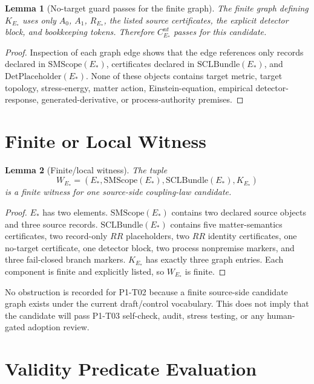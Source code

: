 \documentclass[11pt]{article}
\newcommand{\EStar}{E_{\ast}}
\newcommand{\SMScope}{\mathrm{SMScope}}
\newcommand{\SCLBundle}{\mathrm{SCLBundle}}
\newcommand{\DetPlaceholder}{\mathrm{DetPlaceholder}}
\newcommand{\KStar}{K_{E_{\ast}}}
\newtheorem{lemma}{Lemma}
\begin{document}
\begin{lemma}[No-target guard passes for the finite graph]
The finite graph defining \(\KStar\) uses only \(A_0\), \(A_1\),
\(R_{\EStar}\), the listed source certificates, the explicit detector block,
and bookkeeping tokens. Therefore \(C^{nt}_{\EStar}\) passes for this
candidate.
\end{lemma}

\begin{proof}
Inspection of each graph edge shows that the edge references only records
declared in \(\SMScope(\EStar)\), certificates declared in
\(\SCLBundle(\EStar)\), and \(\DetPlaceholder(\EStar)\). None of these
objects contains target metric, target topology, stress-energy, matter action,
Einstein-equation, empirical detector-response, generated-derivative, or
process-authority premises.
\end{proof}

\section{Finite or Local Witness}

\begin{lemma}[Finite/local witness]
The tuple
\[
  W_{\EStar}=(\EStar,\SMScope(\EStar),\SCLBundle(\EStar),\KStar)
\]
is a finite witness for one source-side coupling-law candidate.
\end{lemma}

\begin{proof}
\(\EStar\) has two elements. \(\SMScope(\EStar)\) contains two declared
source objects and three source records. \(\SCLBundle(\EStar)\) contains five
matter-semantics certificates, two record-only \(RR\) placeholders, two \(RR\)
identity certificates, one no-target certificate, one detector block, two
process nonpremise markers, and three fail-closed branch markers. \(\KStar\)
has exactly three graph entries. Each component is finite and explicitly
listed, so \(W_{\EStar}\) is finite.
\end{proof}

No obstruction is recorded for P1-T02 because a finite source-side candidate
graph exists under the current draft/control vocabulary. This does not imply
that the candidate will pass P1-T03 self-check, audit, stress testing, or any
human-gated adoption review.

\section{Validity Predicate Evaluation}
\end{document}

